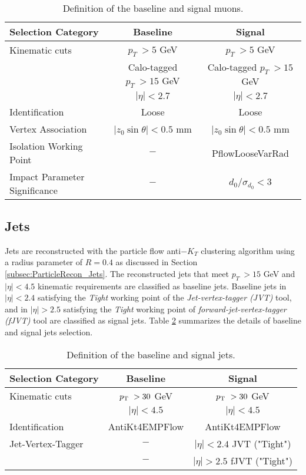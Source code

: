 \begin{table}[ht]
    \centering
        \caption{Definition of the baseline and signal muons.\label{tab:muon_baseline_signal}}
        \begin{tabular}{|| l || c | c ||}
        \hline
        Selection Category & \textbf{Baseline} & \textbf{Signal} \\
        \hline\hline
        Kinematic cuts & $p_{T}~ > 5$ GeV & $p_{T}~ > 5$ GeV \\
                    & Calo-tagged $ p_{T}~ > 15$ GeV & Calo-tagged $ p_{T}~ > 15$ GeV \\
              & $|\eta| < 2.7$ & $|\eta| < 2.7$\\
        \hline
        Identification & Loose & Loose \\
        \hline 
        Vertex Association & $|z_{0}\sin\theta| < 0.5$ mm & $|z_{0}\sin\theta|< 0.5$ mm\\
        \hline
        Isolation Working Point & $-$ & PflowLooseVarRad\\
        \hline 
        Impact Parameter Significance & $-$ & $d_{0}/\sigma_{d_{0}} < 3$ \\
        \hline
    \end{tabular}
\end{table}

\subsection{Jets}
\label{subsec:JetRecon}
Jets are reconstructed with the particle flow anti$-K_{T}$ clustering algorithm using a radius parameter of $R = 0.4$ as discussed in Section \ref{subsec:ParticleRecon_Jets}. The reconstructed jets that meet $p_{T}~ > 15$ GeV and $ |\eta| < 4.5 $ kinematic requirements are classified as baseline jets. Baseline jets in $ |\eta| < 2.4 $ satisfying the \textit{Tight} working point of the \textit{Jet-vertex-tagger (JVT)} tool, and in $ |\eta| > 2.5 $ satisfying the \textit{Tight} working point of \textit{forward-jet-vertex-tagger (fJVT)} tool are classified as signal jets. Table \ref{tab:jets} summarizes the details of baseline and signal jets selection. 

\begin{table}[ht]
    \centering
    \caption{Definition of the baseline and signal jets.\label{tab:jets}}
        \begin{tabular}{|| l || c | c ||}
        \hline
        Selection Category & \textbf{Baseline} & \textbf{Signal} \\
        \hline\hline
        Kinematic cuts & $p_{\textrm{T} ~} > 30$ GeV & $p_{\textrm{T} ~} > 30$ GeV \\
             & $|\eta| < 4.5$ & $|\eta| < 4.5$\\
        \hline 
        Identification & AntiKt4EMPFlow & AntiKt4EMPFlow\\
        \hline
        Jet-Vertex-Tagger & $-$ & $ |\eta| < 2.4 $ JVT ("Tight")\\
                & $-$ & $|\eta| > 2.5 $ fJVT ("Tight")\\
        \hline
    \end{tabular}
\end{table}

